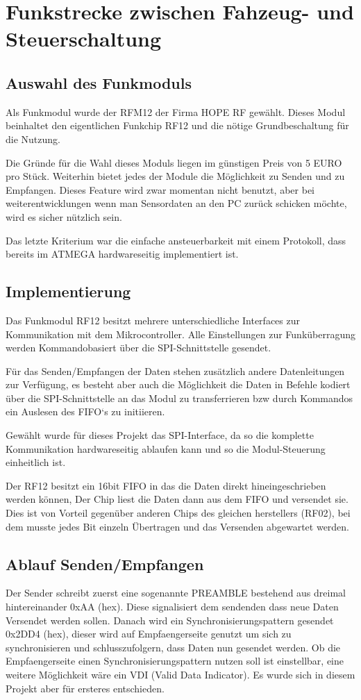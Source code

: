 \documentclass{scrartcl}
\begin{document}
\section{Funkstrecke zwischen Fahzeug- und Steuerschaltung}
	\subsection{Auswahl des Funkmoduls}
		Als Funkmodul wurde der RFM12 der Firma HOPE RF gewählt.
		Dieses Modul beinhaltet den eigentlichen Funkchip RF12 und die nötige Grundbeschaltung für die Nutzung.

		Die Gründe für die Wahl dieses Moduls liegen im günstigen Preis von 5 EURO pro Stück.
		Weiterhin bietet jedes der Module die Möglichkeit zu Senden und zu Empfangen.
		Dieses Feature wird zwar momentan nicht benutzt, aber bei weiterentwicklungen wenn man Sensordaten
		an den PC zurück schicken möchte, wird es sicher nützlich sein.
		
		Das letzte Kriterium war die einfache ansteuerbarkeit mit einem Protokoll, dass bereits im ATMEGA 
		hardwareseitig implementiert ist.
	\subsection{Implementierung}
		Das Funkmodul RF12 besitzt mehrere unterschiedliche Interfaces 
		zur Kommunikation mit dem Mikrocontroller.
		Alle Einstellungen zur Funküberragung werden Kommandobasiert
		über die SPI-Schnittstelle gesendet.

		Für das Senden/Empfangen der Daten stehen zusätzlich andere Datenleitungen
		zur Verfügung, es besteht aber auch die Möglichkeit die Daten in Befehle
		kodiert über die SPI-Schnittstelle an das Modul zu transferrieren bzw
		durch Kommandos ein Auslesen des FIFO`s zu initiieren.

		Gewählt wurde für dieses Projekt das SPI-Interface, da so die komplette 
		Kommunikation hardwareseitig ablaufen kann und so die Modul-Steuerung einheitlich ist.

		Der RF12 besitzt ein 16bit FIFO in das die Daten direkt hineingeschrieben werden können,
		Der Chip liest die Daten dann aus dem FIFO und versendet sie.
		Dies ist von Vorteil gegenüber anderen Chips des gleichen herstellers (RF02), bei dem
		musste jedes Bit einzeln Übertragen und das Versenden abgewartet werden.

	\subsection{Ablauf Senden/Empfangen}
		Der Sender schreibt zuerst eine sogenannte PREAMBLE bestehend aus dreimal 
		hintereinander 0xAA (hex). Diese signalisiert dem sendenden dass neue Daten 
		Versendet werden sollen.
		Danach wird ein Synchronisierungspattern gesendet 0x2DD4 (hex), dieser wird
		auf Empfaengerseite genutzt um sich zu synchronisieren und schlusszufolgern,
		dass Daten nun gesendet werden. Ob die Empfaengerseite einen
		Synchronisierungspattern nutzen soll ist einstellbar, eine weitere Möglichkeit
		wäre ein VDI (Valid Data Indicator). Es wurde sich in diesem Projekt
		aber für ersteres entschieden.
\end{document}
